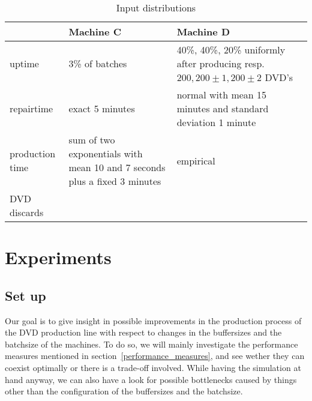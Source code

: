 \documentclass{report}
\begin{document}
\begin{table}[h]
    \begin{tabular}{|p{4cm}|p{4cm}|p{5cm}|}
    \hline
                & Machine C                     & Machine D \\ \hline
uptime          & 3\% of batches                & \parbox{5cm}{40\%, 40\%, 20\% uniformly after producing resp. $200, 200 \pm 1, 200 \pm 2$ DVD's} \\ \hline
repairtime      & exact 5 minutes                   & normal with mean 15 minutes and standard deviation 1 minute \\ \hline
production time & sum of two exponentials with mean 10 and 7 seconds plus a fixed 3 minutes   & empirical \\ \hline
DVD discards    &                               & \\ \hline
    \end{tabular}
    \caption {Input distributions}
    \label{table:input_table}
\end{table}







\chapter{Experiments}
%
\section{Set up}
Our goal is to give insight in possible improvements in the production process of the DVD production line with respect to changes in the buffersizes and the batchsize of the machines.
To do so, we will mainly investigate the performance measures mentioned in section~\ref{performance_measures}, and see wether they can coexist optimally or there is a trade-off involved.
While having the simulation at hand anyway, we can also have a look for possible bottlenecks caused by things other than the configuration of the buffersizes and the batchsize.
\end{document}
